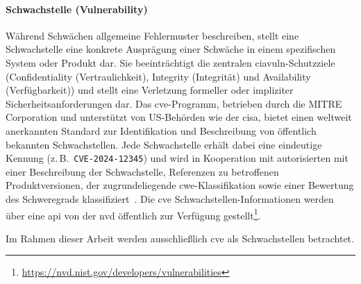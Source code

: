 \paragraph{Schwachstelle (Vulnerability)}

Während Schwächen allgemeine Fehlermuster beschreiben, stellt eine Schwachstelle eine konkrete Ausprägung einer Schwäche in einem spezifischen System oder Produkt dar.
Sie beeinträchtigt die zentralen \acrshort{ciavuln}-Schutzziele (Confidentiality (Vertraulichkeit), Integrity (Integrität) und Availability (Verfügbarkeit)) und stellt eine Verletzung formeller oder impliziter Sicherheitsanforderungen dar.
Das \acrshort{cve}-Programm, betrieben durch die MITRE Corporation und unterstützt von US-Behörden wie der \acrfull{cisa}, bietet einen weltweit anerkannten Standard zur Identifikation und Beschreibung von öffentlich bekannten Schwachstellen.
Jede Schwachstelle erhält dabei eine eindeutige Kennung (z.\,B.\ \verb+CVE-2024-12345+) und wird in Kooperation mit autorisierten  mit einer Beschreibung der Schwachstelle, Referenzen zu betroffenen Produktversionen, der zugrundeliegende \acrshort{cwe}-Klassifikation sowie einer Bewertung des Schweregrads klassifiziert\ \autocite{Ross_Winstead_McEvilley_2022, CveGlossaryCommonVulnerabilitiesAndExposures12mai2025}.
Die \acrshort{cve} Schwachstellen-Informationen werden über eine \acrshort{api} von der \acrshort{nvd} öffentlich zur Verfügung gestellt\footnote{\url{https://nvd.nist.gov/developers/vulnerabilities}}.

Im Rahmen dieser Arbeit werden ausschließlich \acrshort{cve} als Schwachstellen betrachtet.







